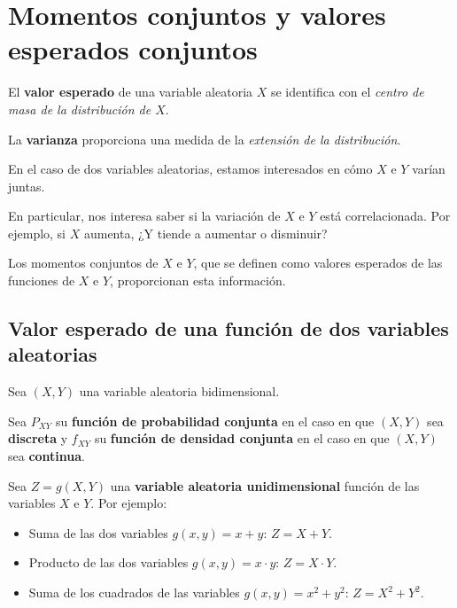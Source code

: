 \documentclass[]{book}
\providecommand{\tightlist}{%
  \setlength{\itemsep}{0pt}\setlength{\parskip}{0pt}}
\begin{document}
\hypertarget{momentos-conjuntos-y-valores-esperados-conjuntos}{%
\section{Momentos conjuntos y valores esperados conjuntos}\label{momentos-conjuntos-y-valores-esperados-conjuntos}}

El \textbf{valor esperado} de una variable aleatoria \(X\) se identifica con el \emph{centro de masa de la distribución de \(X\)}.

La \textbf{varianza} proporciona una medida de la \emph{extensión de la distribución}.

En el caso de dos variables aleatorias, estamos interesados en cómo \(X\) e \(Y\) varían juntas.

En particular, nos interesa saber si la variación de \(X\) e \(Y\) está correlacionada. Por ejemplo, si \(X\) aumenta, ¿Y tiende a aumentar o disminuir?

Los momentos conjuntos de \(X\) e \(Y\), que se definen como valores esperados de las funciones de \(X\) e \(Y\), proporcionan esta información.

\hypertarget{valor-esperado-de-una-funciuxf3n-de-dos-variables-aleatorias}{%
\subsection{Valor esperado de una función de dos variables aleatorias}\label{valor-esperado-de-una-funciuxf3n-de-dos-variables-aleatorias}}

Sea \((X,Y)\) una variable aleatoria bidimensional.

Sea \(P_{XY}\) su \textbf{función de probabilidad conjunta} en el caso en que \((X,Y)\) sea \textbf{discreta} y \(f_{XY}\) su \textbf{función de densidad conjunta} en el caso en que \((X,Y)\) sea \textbf{continua}.

Sea \(Z=g(X,Y)\) una \textbf{variable aleatoria unidimensional} función de las variables \(X\) e \(Y\). Por ejemplo:

\begin{itemize}
\tightlist
\item
  Suma de las dos variables \(g(x,y)=x+y\): \(Z=X+Y\).
\item
  Producto de las dos variables \(g(x,y)=x\cdot y\): \(Z=X\cdot Y\).
\item
  Suma de los cuadrados de las variables \(g(x,y)=x^2+y^2\): \(Z=X^2+Y^2\).
\end{itemize}
\end{document}
